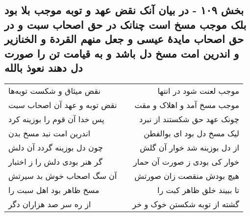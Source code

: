 \begin{center}
\section*{بخش ۱۰۹ - در بیان آنک نقض عهد و توبه موجب بلا بود بلک موجب  مسخ است چنانک در حق اصحاب سبت و در حق اصحاب مایدهٔ  عیسی و جعل منهم القردة و الخنازیر و اندرین امت مسخ دل باشد و به قیامت تن را صورت دل دهند نعوذ بالله}
\label{sec:sh109}
\begin{longtable}{l p{0.5cm} r}
نقض میثاق و شکست توبه‌ها
&&
موجب لعنت شود در انتها
\\
نقض توبه و عهد آن اصحاب سبت
&&
موجب مسخ آمد و اهلاک و مقت
\\
پس خدا آن قوم را بوزینه کرد
&&
چونک عهد حق شکستند از نبرد
\\
اندرین امت نبد مسخ بدن
&&
لیک مسخ دل بود ای بوالفطن
\\
چون دل بوزینه گردد آن دلش
&&
از دل بوزینه شد خوار آن گلش
\\
گر هنر بودی دلش را ز اختبار
&&
خوار کی بودی ز صورت آن حمار
\\
آن سگ اصحاب خوش بد سیرتش
&&
هیچ بودش منقصت زان صورتش
\\
مسخ ظاهر بود اهل سبت را
&&
تا ببیند خلق ظاهر کبت را
\\
از ره سر صد هزاران دگر
&&
گشته از توبه شکستن خوک و خر
\\
\end{longtable}
\end{center}
